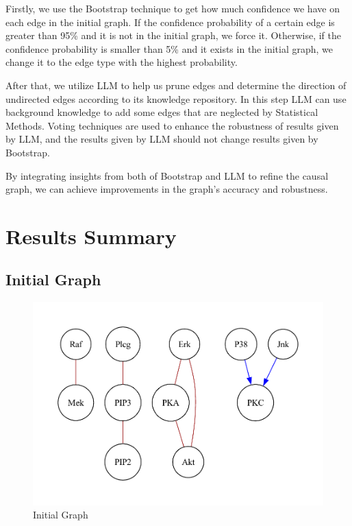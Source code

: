 \documentclass{article}
\begin{document}
Firstly, we use the Bootstrap technique to get how much confidence we have on each edge in the initial graph.
If the confidence probability of a certain edge is greater than 95\% and it is not in the initial graph, we force it.
Otherwise, if the confidence probability is smaller than 5\% and it exists in the initial graph, we change it to the edge type with the highest probability.
            
After that, we utilize LLM to help us prune edges and determine the direction of undirected edges according to its knowledge repository.
In this step LLM can use background knowledge to add some edges that are neglected by Statistical Methods.
Voting techniques are used to enhance the robustness of results given by LLM, and the results given by LLM should not change results given by Bootstrap.

By integrating insights from both of Bootstrap and LLM to refine the causal graph, we can achieve improvements in the graph's accuracy and robustness.
            

\section{Results Summary}

\subsection{Initial Graph}

\begin{figure}[H]
    \centering
    \includegraphics[height=0.3\textheight]{./demo_data/20241104_135804/sachs/output_graph/initial_graph.pdf}
    \caption{Initial Graph}
\end{figure}
\end{document}
